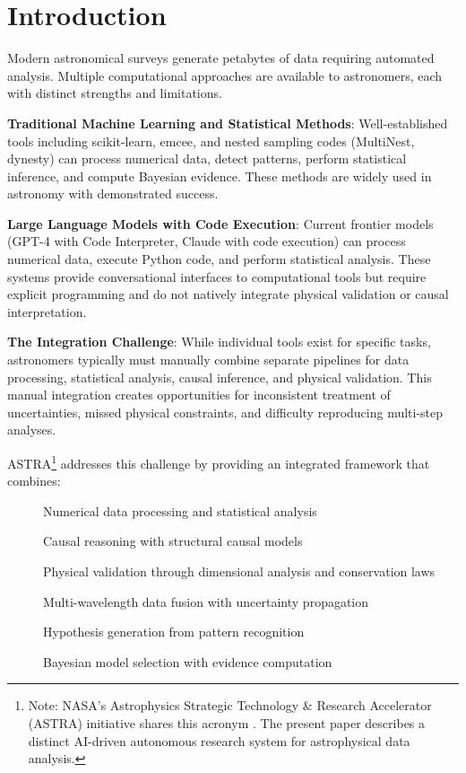 \documentclass[usenatbib]{rasti}
\begin{document}
\section{Introduction}

Modern astronomical surveys generate petabytes of data requiring automated analysis. Multiple computational approaches are available to astronomers, each with distinct strengths and limitations.

\textbf{Traditional Machine Learning and Statistical Methods}: Well-established tools including scikit-learn, emcee, and nested sampling codes (MultiNest, dynesty) can process numerical data, detect patterns, perform statistical inference, and compute Bayesian evidence. These methods are widely used in astronomy with demonstrated success.

\textbf{Large Language Models with Code Execution}: Current frontier models (GPT-4 with Code Interpreter, Claude with code execution) can process numerical data, execute Python code, and perform statistical analysis. These systems provide conversational interfaces to computational tools but require explicit programming and do not natively integrate physical validation or causal interpretation.

\textbf{The Integration Challenge}: While individual tools exist for specific tasks, astronomers typically must manually combine separate pipelines for data processing, statistical analysis, causal inference, and physical validation. This manual integration creates opportunities for inconsistent treatment of uncertainties, missed physical constraints, and difficulty reproducing multi-step analyses.

ASTRA\footnote{Note: NASA's Astrophysics Strategic Technology \& Research Accelerator (ASTRA) initiative shares this acronym \citep[see][]{caputo2026nasa}. The present paper describes a distinct AI-driven autonomous research system for astrophysical data analysis.} addresses this challenge by providing an integrated framework that combines:
\begin{description}
\item[] Numerical data processing and statistical analysis
\item[] Causal reasoning with structural causal models
\item[] Physical validation through dimensional analysis and conservation laws
\item[] Multi-wavelength data fusion with uncertainty propagation
\item[] Hypothesis generation from pattern recognition
\item[] Bayesian model selection with evidence computation
\end{description}
\end{document}
